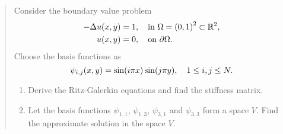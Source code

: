 \documentclass[english]{exercise}
\begin{document}
	\section{}

	\begin{quote}
		Consider the boundary value problem
		\begin{align*}
			-\Delta u\parentheses*{x, y} &= 1, \quad \text{in }\Omega = \parentheses*{0, 1}^2 \subset \R^2,\\
			u\parentheses*{x, y} &= 0, \quad \text{on }\partial\Omega.
		\end{align*}
		Choose the basis functions as
		\[
			\psi_{i, j}\parentheses*{x, y} = \sin\parentheses*{i\pi x}\sin\parentheses*{j\pi y}, \quad 1 \le i, j \le N.
		\]
		\begin{enumerate}
			\item Derive the Ritz-Galerkin equations and find the stiffness matrix.
			\item Let the basis functions \(\psi_{1, 1}\), \(\psi_{1, 3}\), \(\psi_{3, 1}\) and \(\psi_{3, 3}\) form a space \(V\).
			Find the approximate solution in the space \(V\).
		\end{enumerate}
	\end{quote}
\end{document}
